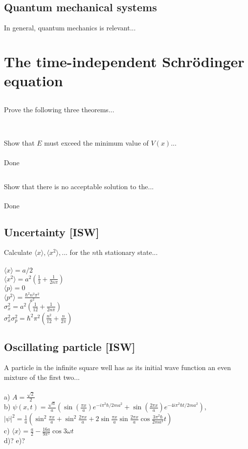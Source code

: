 \documentclass{article}
\newcommand{\<}{\langle}
\renewcommand{\>}{\rangle}
\begin{document}
\subsection{Quantum mechanical systems}
In general, quantum mechanics is relevant...

\section{The time-independent Schr\"odinger equation}

\subsection{}
Prove the following three theorems...
\\ \\
\subsection{}
Show that $E$ must exceed the minimum value of $V(x)$...
\\ \\
Done
\subsection{}
Show that there is no acceptable solution to the...
\\ \\
Done
\subsection{Uncertainty [ISW]}
Calculate $\<x\>, \<x^2\>,...$ for the $n$th stationary state...
\\ \\
$\<x\> = a/2$ \\
$\<x^2\> = a^2 \left( \frac{1}{3} + \frac{1}{2n\pi} \right)$ \\
$\<p\> = 0$ \\
$\<p^2\> = \frac{\hbar^2 n^2 \pi^2}{a^2} $ \\
$\sigma_x^2 = a^2 \left( \frac{1}{12} + \frac{1}{2n\pi} \right) $ \\
$\sigma_x^2 \sigma_p^2 = \hbar^2 \pi^2 \left( \frac{n^2}{12} + \frac{n}{2\pi} \right) $
\subsection{Oscillating particle [ISW]}
A particle in the infinite square well has as its initial wave function an even mixture of the first two...
\\ \\
a) $A = \frac{\sqrt 2}{2}$ \\
b) $\psi(x,t) = \frac{\sqrt a}{a} \left(\sin(\frac{\pi x}{a}) e^{-i\pi^2\hbar / 2ma^2} + \sin(\frac{2\pi x}{a})e^{-4i\pi^2\hbar t / 2ma^2}\right)$,
$|\psi|^2 = \frac{1}{a} \left( \sin^2\frac{\pi x}{a} + \sin^2\frac{2\pi x}{a} + 2\sin\frac{\pi x}{a}\sin\frac{2\pi x}{a}\cos\frac{3\pi^2\hbar}{2ma^2}t  \right)$ \\
c) $\<x\> = \frac{a}{2} - \frac{16a}{9\pi^2} \cos 3\omega t$ \\
d)? e)?
\end{document}
